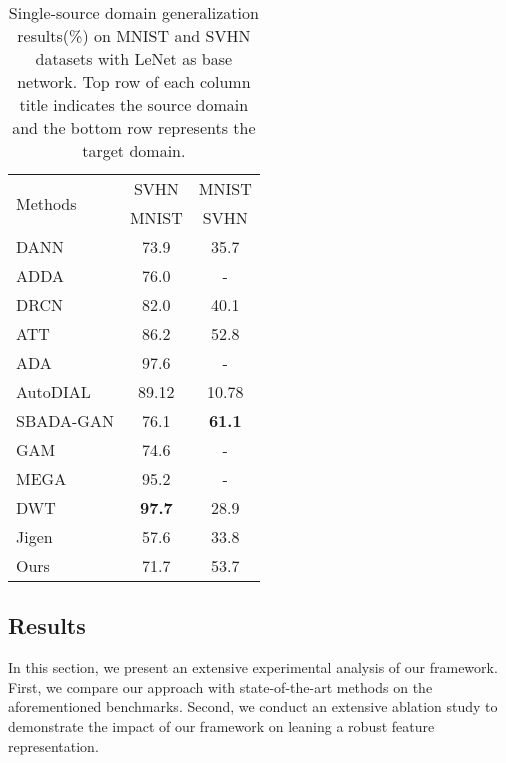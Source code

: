 \documentclass[10pt,twocolumn,letterpaper]{article}
\begin{document}
\begin{table}[t!]
	\begin{center}
		\tabcolsep=0.15cm
		\begin{tabular}{l|c c}
			\hline
			\hline
			\multirow{2}{*}{Methods}&SVHN&MNIST\\
			&MNIST&SVHN\\
			\hline
			DANN\cite{ganin2016domain}&73.9&35.7\\
			ADDA\cite{tzeng2017adversarial}&76.0&-\\
			DRCN\cite{ghifary2016deep}&82.0&40.1\\
			ATT\cite{saito2017asymmetric}&86.2&52.8\\
			ADA\cite{haeusser2017associative}&97.6&-\\
			AutoDIAL\cite{cariucci2017autodial}&89.12&10.78\\
			SBADA-GAN\cite{russo2018source}&76.1&\textbf{61.1}\\
			GAM\cite{huang2018domain}&74.6&-\\
			MEGA\cite{morerio2017minimal}&95.2&-\\
			DWT\cite{roy2019unsupervised}&\textbf{97.7}&28.9\\
			Jigen\cite{carlucci2019domain}&57.6&33.8\\
			Ours&71.7&53.7\\
			\hline\hline
		\end{tabular}
	\end{center}
	\caption{Single-source domain generalization results(\%) on MNIST and SVHN datasets with LeNet as base network. Top row of each column title indicates the source domain and the bottom row represents the target domain.}
	\label{table4}
\end{table}

\subsection{Results}\label{results}
In this section, we present an extensive experimental analysis of our framework. First, we compare our approach with state-of-the-art methods on the aforementioned benchmarks.
Second, we conduct an extensive ablation study to demonstrate the impact of our framework on leaning a robust feature representation.
\end{document}
